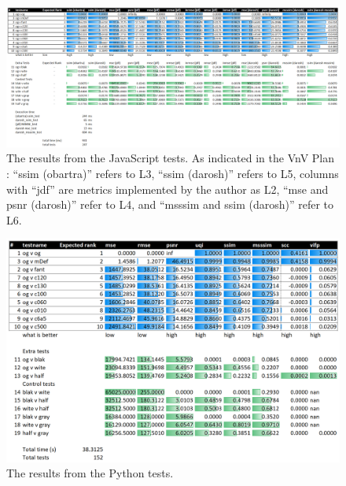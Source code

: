 \documentclass[12pt, titlepage]{article}
\begin{document}
\begin{landscape}
\vspace*{\fill}
\begin{figure}[h!]
  \begin{center}
  \includegraphics[width=22cm]{test-analysis/js-tests-results.png}
  \caption{The results from the JavaScript tests.
  As indicated in the VnV Plan \cite{VnV_plan}:
  ``ssim (obartra)'' refers to L3, ``ssim (darosh)'' refers to L5,
  columns with ``jdf'' are metrics implemented by the author as L2,
  ``mse and psnr (darosh)'' refer to L4, and
  ``msssim and ssim (darosh)'' refer to L6.}
  \label{fig_js_results}
  \end{center}
\end{figure}
\vspace*{\fill}
\end{landscape}

\begin{figure}[h!]
  \begin{center}
  \includegraphics[width=1.0\textwidth]{test-analysis/py-tests-results.png}
  \caption{The results from the Python tests.}
  \label{fig_py_results}
  \end{center}
\end{figure}
\end{document}
